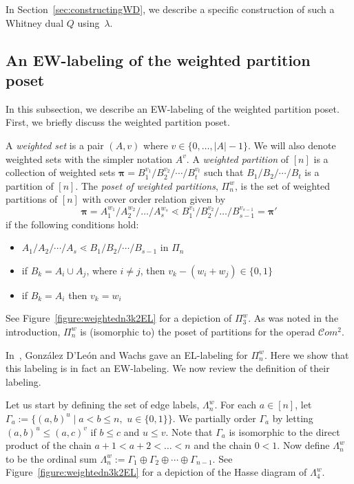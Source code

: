 \documentclass[11pt]{article}
\theoremstyle{definition}
\numberwithin{equation}{section}
\newcommand{\Com}{\mathcal{C}om}
\newcommand{\bpi}{\pmb{\pi}}
\begin{document}
In Section~\ref{sec:constructingWD}, we describe a specific construction of such a Whitney dual $Q$ using~$\lambda$. 

\subsection{An EW-labeling of the weighted partition poset}\label{sec:EWforWeighted}

In this subsection, we describe an EW-labeling of the weighted partition poset.  First, we briefly discuss the weighted partition poset.

A \emph{weighted set} is a pair $(A,v)$ where $v\in\{0,\dots, |A|-1\}$. We will also denote weighted sets with the simpler notation $A^v$. A \emph{weighted partition} of $[n]$ is a collection of weighted sets $\bpi=B_1^{v_1}/B_2^{v_2}/\cdots/B_t^{v_t}$  such that  
$B_1/B_2/\cdots/B_t$ is a partition of $[n]$. The \emph{poset of weighted partitions}, $\Pi_n^{w}$,  is the set of weighted 
partitions of $[n]$ with cover order relation given by 
$$\bpi=A_1^{w_1}/A_2^{w_2}/\dots /A_s^{w_s}\lessdot B_1^{v_1}/ B_2^{v_2}/ \dots /B_{s-1}^{v_{s-1}}=\bpi'$$ 
if the following conditions hold:
\begin{itemize}
 \item $A_1/A_2/\cdots /A_s \lessdot B_1/B_2/ \cdots /B_{s-1} $ in $\Pi_n$
 \item if $B_k=A_{i}\cup A_{j}$, where $i \ne j$, then $v_k-(w_{i} + w_{j}) \in \{0,1\}$
 \item if $B_k = A_i$ then $v_k = w_i$
 \end{itemize}
See Figure~\ref{figure:weightedn3k2EL} for a depiction of $\Pi_3^w$. As was noted in the introduction, $\Pi_n^w$ is (isomorphic to) the poset of partitions for the operad $\Com^2$.
 
In~\cite{GonzalezDleonWachs2016}, Gonz\'alez D'Le\'on and Wachs gave an EL-labeling for $\Pi_n^w$. Here we show that this labeling is in fact an EW-labeling.  We now review the definition of their labeling. 

Let us start by defining the set of edge labels, $\Lambda^w_n$. For each $a \in [n]$, let $\Gamma_a:= \{(a,b)^u \mid   
a<b \le n, \,\, u \in \{0,1\} \}$.  
We partially order $\Gamma_a$  by letting $(a,b)^u \le  (a,c)^v$ if $b\le  c$ and $u \le v$. Note that $\Gamma_a$ is isomorphic to the direct product of the chain $a+1< a+2 <\dots < n $ and
the chain $0 < 1$.  Now define $\Lambda^w_n$ to be the 
ordinal sum
$\Lambda^w_n := \Gamma_1 \oplus  \Gamma_2  \oplus \cdots \oplus \Gamma_{n-1}$. See Figure~\ref{figure:weightedn3k2EL} for a depiction of the Hasse diagram of $\Lambda^w_4$.
\end{document}

